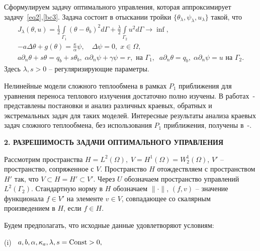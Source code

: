 \documentclass[12pt]{article}
\begin{document}
    Сформулируем задачу оптимального управления, которая аппроксимирует задачу~\eqref{eq2},\eqref{bc3}.
    Задача состоит в отыскании тройки $\{\theta_\lambda,\psi_\lambda,u_\lambda\}$ такой, что
    \begin{equation}
        \label{cost}
        \begin{split}
            J_\lambda(\theta, u) = \frac{1}{2}\int\limits_{\Gamma_1} (\theta - \theta_b)^2d\Gamma + \frac{\lambda}{2}\int\limits_{\Gamma_2} u^2d\Gamma \rightarrow\inf, \\
            - a \Delta \theta + g (\theta) = \frac{\kappa}{\alpha}\psi, \quad
            \Delta \psi = 0, \; x \in \Omega,\\
            a \partial_n \theta + s \theta = q_b + s\theta_b, \; \alpha \partial_n \psi + \gamma \psi = r, \text{ на } \Gamma_1,\;\; a \partial_n \theta  = q_b,\;
            \alpha \partial_n \psi = u \text{ на } \Gamma_2.
        \end{split}
    \end{equation}
    Здесь $\lambda, s > 0$ -- регуляризирующие параметры.


    Нелинейные модели сложного теплообмена в рамках $P_1$ приближения для уравнения переноса теплового
    излучения достаточно полно изучены.
    В работах~\cite{Pinnau07}-\cite{JVM-19-INV} представлены постановки и анализ различных краевых,
    обратных и экстремальных задач для таких моделей.
    Интересные результаты анализа краевых задач сложного теплообмена,
    без использования $P_1$ приближения, получены в~\cite{Amosov16}-\cite{Amosov20-1}.


    \begin{center}
        \textbf{2. РАЗРЕШИМОСТЬ ЗАДАЧИ ОПТИМАЛЬНОГО УПРАВЛЕНИЯ}
    \end{center}

    Рассмотрим пространства $H = L^2(\Omega), \; V = H^1(\Omega)=W^1_2(\Omega)$, $V'$ -- пространство, сопряженное с $V$.
    Пространство $H$ отождествляем с пространством $H'$ так, что $V \subset H = H' \subset V'$.
    Через $U$ обозначаем пространство управлений $L^2(\Gamma_2)$.
    Стандартную норму в $H$ обозначаем $\|\cdot\|$,
    $(f,v)$ -- значение функционала $f\in V'$ на элементе $v\in V$,
    совпадающее со скалярным произведением в $H$, если $f\in H$.


    Будем предполагать, что исходные данные удовлетворяют условиям:

    (i) $\;\; a,b,\alpha,\kappa_a, \lambda, s ={\rm Const}> 0 ,$
\end{document}
